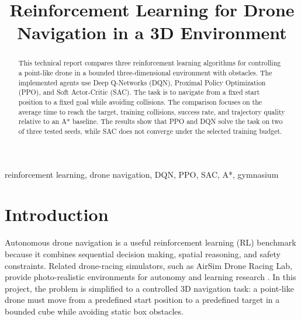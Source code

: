 \documentclass[conference]{IEEEtran}
\begin{document}
\title{Reinforcement Learning for Drone Navigation in a 3D Environment}

\author{
\and
{}
}

\maketitle

\begin{abstract}
This technical report compares three reinforcement learning algorithms for
controlling a point-like drone in a bounded three-dimensional environment with
obstacles. The implemented agents use Deep Q-Networks (DQN), Proximal Policy
Optimization (PPO), and Soft Actor-Critic (SAC). The task is to navigate from a
fixed start position to a fixed goal while avoiding collisions. The comparison
focuses on the average time to reach the target, training collisions, success
rate, and trajectory quality relative to an A* baseline. The results show that
PPO and DQN solve the task on two of three tested seeds, while SAC does not
converge under the selected training budget.
\end{abstract}

\begin{IEEEkeywords}
reinforcement learning, drone navigation, DQN, PPO, SAC, A*, gymnasium
\end{IEEEkeywords}

\section{Introduction}

Autonomous drone navigation is a useful reinforcement learning (RL) benchmark
because it combines sequential decision making, spatial reasoning, and safety
constraints. Related drone-racing simulators, such as AirSim Drone Racing Lab,
provide photo-realistic environments for autonomy and learning research
\cite{madaan2020airsim}. In this project, the problem is simplified to a
controlled 3D navigation task: a point-like drone must move from a predefined
start position to a predefined target in a bounded cube while avoiding static
box obstacles.
\end{document}
